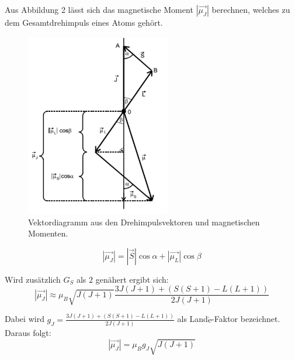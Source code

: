 
Aus Abbildung 2 lässt sich das magnetische Moment $|\vec{\mu_J}|$ berechnen, welches zu dem Gesamtdrehimpuls eines Atoms gehört.

\begin{figure}[H]
  \centering
  \includegraphics[height=8cm]{geometrie.PNG}
  \caption{Vektordiagramm aus den Drehimpulsvektoren und magnetischen Momenten. \cite{sample}}
  \label{fig:Linienspektrum}
\end{figure}

\begin{equation}
  |\vec{\mu_J}| = |\vec{S}| \cos{\alpha} + |\vec{\mu_L}| \cos{\beta}
\end{equation}

Wird zusätzlich $G_S$ als $2$ genähert ergibt sich:
\begin{equation}
  |\vec{\mu_J}| \approx \mu_B \sqrt{J(J+1)} \frac{3J(J+1)+ (S(S+1)-L(L+1))}{2J(J+1)}
\end{equation}

Dabei wird $g_J =  \frac{3J(J+1)+ (S(S+1)-L(L+1))}{2J(J+1)}$ als Land$\acute{\text{e}}$-Faktor bezeichnet.
Daraus folgt:
\begin{equation}
  |\vec{\mu_J}| = \mu_B g_J \sqrt{J(J+1)}
\end{equation}

